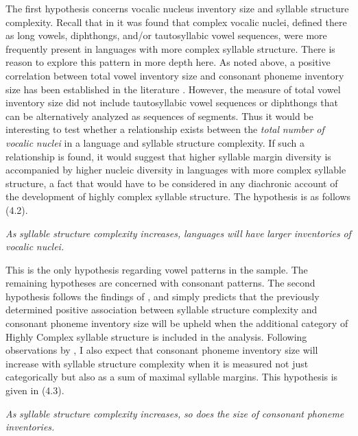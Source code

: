   The first hypothesis concerns vocalic nucleus inventory size and syllable structure complexity. Recall that in  it was found that complex vocalic nuclei, defined there as long vowels, diphthongs, and/or tautosyllabic vowel sequences, were more frequently present in languages with more complex syllable structure. There is reason to explore this pattern in more depth here. As noted above, a positive correlation between total vowel inventory size and consonant phoneme inventory size has been established in the literature \citep{Maddieson2011}. However, the measure of total vowel inventory size did not include tautosyllabic vowel sequences or diphthongs that can be alternatively analyzed as sequences of segments. Thus it would be interesting to test whether a relationship exists between the \textit{total} \textit{number} \textit{of} \textit{vocalic} \textit{nuclei} in a language and syllable structure complexity. If such a relationship is found, it would suggest that higher syllable margin diversity is accompanied by higher nucleic diversity in languages with more complex syllable structure, a fact that would have to be considered in any diachronic account of the development of highly complex syllable structure. The hypothesis is as follows (4.2).

\ea\label{ex:(4.2)}
  \textit{As} \textit{syllable} \textit{structure} \textit{complexity} \textit{increases,} \textit{languages} \textit{will} \textit{have} \textit{larger} \textit{inventories} \textit{of} \textit{vocalic} \textit{nuclei.}
\z

  This is the only hypothesis regarding vowel patterns in the sample. The remaining hypotheses are concerned with consonant patterns. The second hypothesis follows the findings of \citet{Maddieson2006}, and simply predicts that the previously determined positive association between syllable structure complexity and consonant phoneme inventory size will be upheld when the additional category of Highly Complex syllable structure is included in the analysis. Following observations by \citet{Gordon2016}, I also expect that consonant phoneme inventory size will increase with syllable structure complexity when it is measured not just categorically but also as a sum of maximal syllable margins. This hypothesis is given in (4.3).

\ea\label{ex:(4.3)}
  \textit{As} \textit{syllable} \textit{structure} \textit{complexity} \textit{increases,} \textit{so} \textit{does} \textit{the} \textit{size} \textit{of} \textit{consonant} \textit{phoneme} \textit{inventories.}
\z

